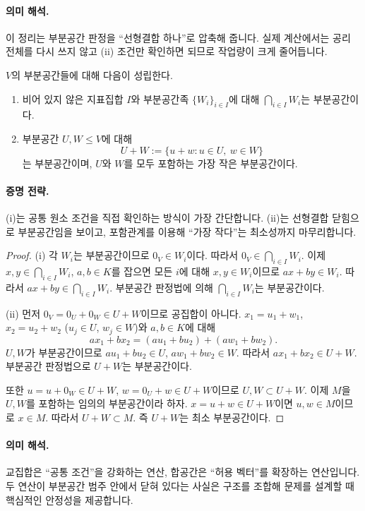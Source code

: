 \paragraph{의미 해석.}
이 정리는 부분공간 판정을 ``선형결합 하나''로 압축해 줍니다. 실제 계산에서는 공리 전체를 다시 쓰지 않고 (ii) 조건만 확인하면 되므로 작업량이 크게 줄어듭니다.

\begin{theorem}
$V$의 부분공간들에 대해 다음이 성립한다.
\begin{enumerate}[label=(\roman*)]
\item 비어 있지 않은 지표집합 $I$와 부분공간족 $\{W_i\}_{i\in I}$에 대해 $\bigcap_{i\in I}W_i$는 부분공간이다.
\item 부분공간 $U,W\le V$에 대해
\[
U+W:=\{u+w:u\in U,\ w\in W\}
\]
는 부분공간이며, $U$와 $W$를 모두 포함하는 가장 작은 부분공간이다.
\end{enumerate}
\end{theorem}

\paragraph{증명 전략.}
(i)는 공통 원소 조건을 직접 확인하는 방식이 가장 간단합니다. (ii)는 선형결합 닫힘으로 부분공간임을 보이고, 포함관계를 이용해 ``가장 작다''는 최소성까지 마무리합니다.

\begin{proof}
(i) 각 $W_i$는 부분공간이므로 $0_V\in W_i$이다. 따라서 $0_V\in\bigcap_{i\in I}W_i$. 이제 $x,y\in\bigcap_{i\in I}W_i$, $a,b\in K$를 잡으면 모든 $i$에 대해 $x,y\in W_i$이므로 $ax+by\in W_i$. 따라서 $ax+by\in\bigcap_{i\in I}W_i$. 부분공간 판정법에 의해 $\bigcap_{i\in I}W_i$는 부분공간이다.

(ii) 먼저 $0_V=0_U+0_W\in U+W$이므로 공집합이 아니다. $x_1=u_1+w_1$, $x_2=u_2+w_2$ ($u_j\in U$, $w_j\in W$)와 $a,b\in K$에 대해
\[
ax_1+bx_2=(au_1+bu_2)+(aw_1+bw_2).
\]
$U,W$가 부분공간이므로 $au_1+bu_2\in U$, $aw_1+bw_2\in W$. 따라서 $ax_1+bx_2\in U+W$. 부분공간 판정법으로 $U+W$는 부분공간이다.

또한 $u=u+0_W\in U+W$, $w=0_U+w\in U+W$이므로 $U,W\subset U+W$. 이제 $M$을 $U,W$를 포함하는 임의의 부분공간이라 하자. $x=u+w\in U+W$이면 $u,w\in M$이므로 $x\in M$. 따라서 $U+W\subset M$. 즉 $U+W$는 최소 부분공간이다.
\end{proof}

\paragraph{의미 해석.}
교집합은 ``공통 조건''을 강화하는 연산, 합공간은 ``허용 벡터''를 확장하는 연산입니다. 두 연산이 부분공간 범주 안에서 닫혀 있다는 사실은 구조를 조합해 문제를 설계할 때 핵심적인 안정성을 제공합니다.

